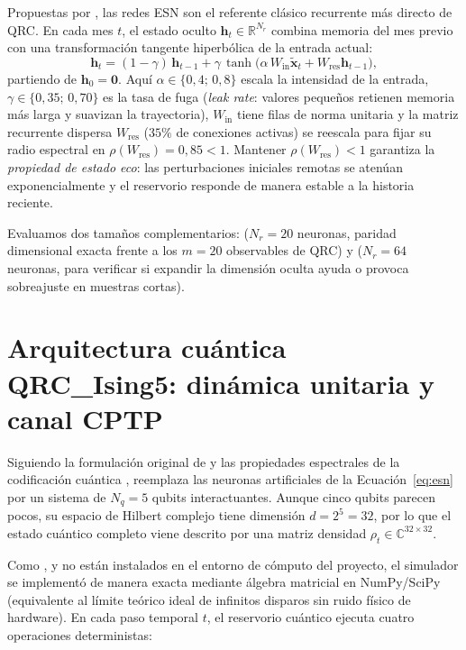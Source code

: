 \documentclass[12pt,letterpaper]{article}
\begin{document}
Propuestas por \textcite{jaeger2001}, las redes ESN son el referente clásico recurrente más directo de QRC. En cada mes \(t\), el estado oculto \(\mathbf{h}_t \in \mathbb{R}^{N_r}\) combina memoria del mes previo con una transformación tangente hiperbólica de la entrada actual:
\begin{equation}
  \mathbf{h}_t = (1 - \gamma)\,\mathbf{h}_{t-1} + \gamma\, \tanh\bigl(\alpha\, W_{\text{in}}\tilde{\mathbf{x}}_t + W_{\text{res}} \mathbf{h}_{t-1}\bigr),
  \label{eq:esn}
\end{equation}
partiendo de \(\mathbf{h}_0 = \mathbf{0}\). Aquí \(\alpha \in \{0{,}4;\, 0{,}8\}\) escala la intensidad de la entrada, \(\gamma \in \{0{,}35;\, 0{,}70\}\) es la tasa de fuga (\emph{leak rate}: valores pequeños retienen memoria más larga y suavizan la trayectoria), \(W_{\text{in}}\) tiene filas de norma unitaria y la matriz recurrente dispersa \(W_{\text{res}}\) (\(35\%\) de conexiones activas) se reescala para fijar su radio espectral en \(\rho(W_{\text{res}}) = 0{,}85 < 1\). Mantener \(\rho(W_{\text{res}}) < 1\) garantiza la \emph{propiedad de estado eco}: las perturbaciones iniciales remotas se atenúan exponencialmente y el reservorio responde de manera estable a la historia reciente.

Evaluamos dos tamaños complementarios:  (\(N_r = 20\) neuronas, paridad dimensional exacta frente a los \(m = 20\) observables de QRC) y  (\(N_r = 64\) neuronas, para verificar si expandir la dimensión oculta ayuda o provoca sobreajuste en muestras cortas).

\section{Arquitectura cuántica QRC\_Ising5: dinámica unitaria y canal CPTP}

Siguiendo la formulación original de \textcite{fujii2017} y las propiedades espectrales de la codificación cuántica \parencite{schuld2021},  reemplaza las neuronas artificiales de la Ecuación~\ref{eq:esn} por un sistema de \(N_q = 5\) qubits interactuantes. Aunque cinco qubits parecen pocos, su espacio de Hilbert complejo tiene dimensión \(d = 2^5 = 32\), por lo que el estado cuántico completo viene descrito por una matriz densidad \(\rho_t \in \mathbb{C}^{32\times 32}\).

Como ,  y  no están instalados en el entorno de cómputo del proyecto, el simulador se implementó de manera exacta mediante álgebra matricial en NumPy/SciPy (equivalente al límite teórico ideal de infinitos disparos sin ruido físico de hardware). En cada paso temporal \(t\), el reservorio cuántico ejecuta cuatro operaciones deterministas:
\end{document}
